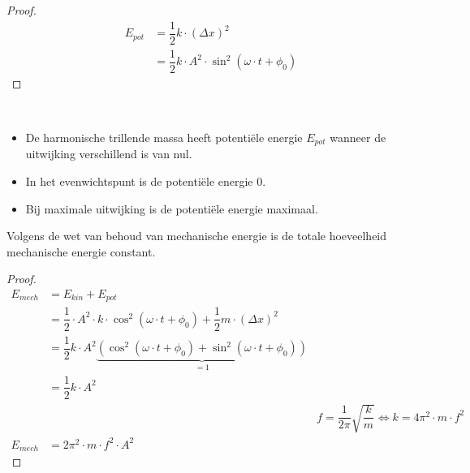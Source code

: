 \documentclass{ximera}
\begin{document}
\begin{proof}
\begin{align*}
    E_{pot} & = \dfrac{1}{2}k\cdot (\Delta x)^2 \\
    &=\dfrac{1}{2}k\cdot A^2\cdot  \sin^2 (\omega \cdot t+\phi_0)
\end{align*}
\end{proof}


\begin{definition}
      \ \\
    \begin{center}
    \end{center}
\end{definition}
\begin{remark}
    \begin{itemize}
        \item
	De harmonische trillende massa heeft potentiële energie $E_{pot}$ wanneer de uitwijking verschillend is van nul.
	\item In het evenwichtspunt is de potentiële energie 0.
	\item Bij maximale uitwijking is de potentiële energie maximaal.

    \end{itemize}
\end{remark}


Volgens de wet van behoud van mechanische energie is de totale hoeveelheid mechanische energie constant.
\begin{proof}
\begin{align*}
    E_{mech} &=E_{kin}+E_{pot} \\
    & =\dfrac{1}{2}\cdot A^2\cdot k \cdot \cos^2 (\omega \cdot t+\phi_0) + \dfrac{1}{2}m\cdot (\Delta x)^2 \\
    &=\dfrac{1}{2}k\cdot A^2  \underbrace{\left(\cos^2 (\omega \cdot t+\phi_0)+\sin^2 (\omega \cdot t+\phi_0)\right)}_{=1} \\
    &=\dfrac{1}{2}k\cdot A^2  \\
    &&f=\dfrac{1}{2\pi}\sqrt{\dfrac{k}{m}} \Leftrightarrow k=4\pi^2\cdot m \cdot f^2 \\
    E_{mech} &= 2\pi^2\cdot m\cdot f^2 \cdot A^2
\end{align*}
\end{proof}


\begin{definition}
      \ \\
    \begin{center}
    \end{center}
\end{definition}
\end{document}
